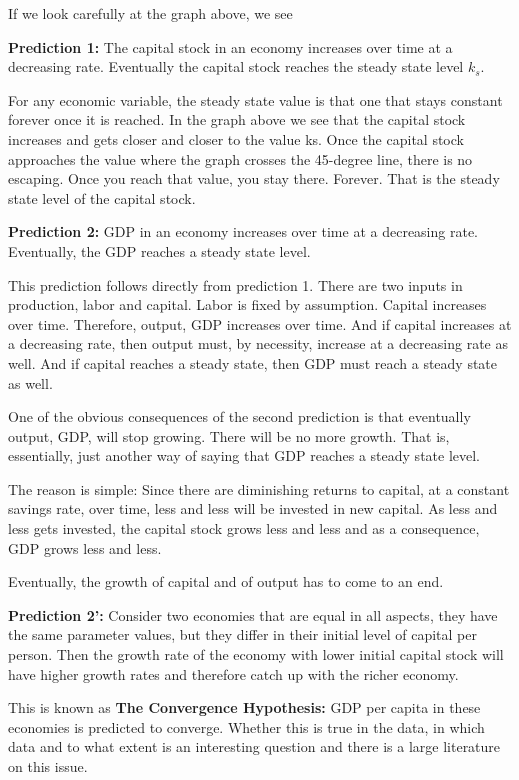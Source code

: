 \documentclass[
]{book}
\begin{document}
If we look carefully at the graph above, we see

\textbf{Prediction 1:} The capital stock in an economy increases over time at a decreasing rate. Eventually the capital stock reaches the steady state level \(k_s\).

For any economic variable, the steady state value is that one that stays constant forever once it is reached.
In the graph above we see that the capital stock increases and gets closer and closer to the value ks. Once the capital stock approaches the value where the graph crosses the 45-degree line, there is no escaping. Once you reach that value, you stay there. Forever. That is the steady state level of the capital stock.

\textbf{Prediction 2:} GDP in an economy increases over time at a decreasing rate. Eventually, the GDP reaches a steady state level.

This prediction follows directly from prediction 1. There are two inputs in production, labor and capital. Labor is fixed by assumption. Capital increases over time. Therefore, output, GDP increases over time. And if capital increases at a decreasing rate, then output must, by necessity, increase at a decreasing rate as well. And if capital reaches a steady state, then GDP must reach a steady state as well.

One of the obvious consequences of the second prediction is that eventually output, GDP, will stop growing. There will be no more growth. That is, essentially, just another way of saying that GDP reaches a steady state level.

The reason is simple: Since there are diminishing returns to capital, at a constant savings rate, over time, less and less will be invested in new capital. As less and less gets invested, the capital stock grows less and less and as a consequence, GDP grows less and less.

Eventually, the growth of capital and of output has to come to an end.

\textbf{Prediction 2':} Consider two economies that are equal in all aspects, they have the same parameter values, but they differ in their initial level of capital per person. Then the growth rate of the economy with lower initial capital stock will have higher growth rates and therefore catch up with the richer economy.

This is known as \textbf{The Convergence Hypothesis:} GDP per capita in these economies is predicted to converge. Whether this is true in the data, in which data and to what extent is an interesting question and there is a large literature on this issue.
\end{document}

